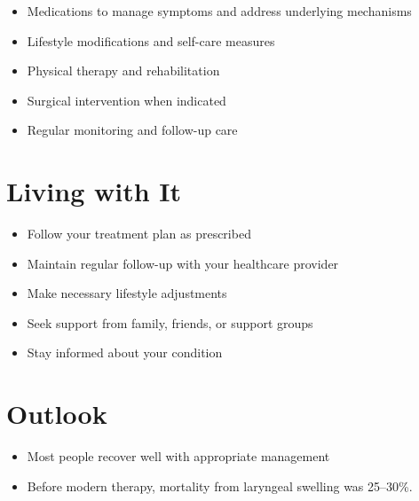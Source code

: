 \begin{itemize}[noitemsep]
  \item Medications to manage symptoms and address underlying mechanisms
  \item Lifestyle modifications and self-care measures
  \item Physical therapy and rehabilitation
  \item Surgical intervention when indicated
  \item Regular monitoring and follow-up care
\end{itemize}
\section{Living with It}
\begin{itemize}[noitemsep]
  \item Follow your treatment plan as prescribed
  \item Maintain regular follow-up with your healthcare provider
  \item Make necessary lifestyle adjustments
  \item Seek support from family, friends, or support groups
  \item Stay informed about your condition
\end{itemize}
\section{Outlook}
\begin{itemize}[noitemsep]
  \item Most people recover well with appropriate management
  \item Before modern therapy, mortality from laryngeal swelling was 25--30\%.
\end{itemize}
